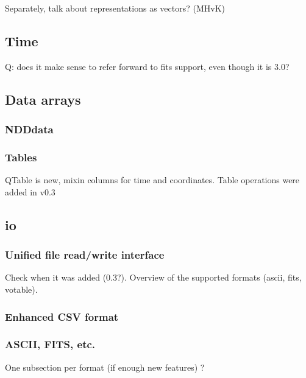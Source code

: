 \documentclass[modern]{aastex61}
\begin{document}
Separately, talk about representations as vectors? (MHvK)

\subsection{Time}
\label{sec:time}

Q: does it make sense to refer forward to fits support, even though it is 3.0?

\subsection{Data arrays}

\subsubsection{NDDdata}

\subsubsection{Tables}
\label{sec:table}
QTable is new, mixin columns for time and coordinates. Table operations were added in v0.3

\subsection{io}

\subsubsection{Unified file read/write interface}

Check when it was added (0.3?). Overview of the supported formats (ascii, fits, votable).

\subsubsection{Enhanced CSV format}

\subsubsection{ASCII, FITS, etc.}

One subsection per format (if enough new features) ?
\end{document}
